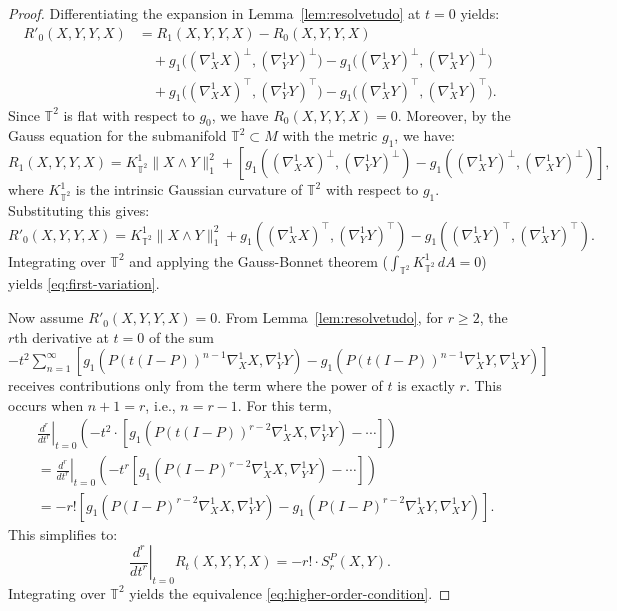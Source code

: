 \documentclass[10pt,a4paper]{amsart}
\begin{document}
\begin{proof}
Differentiating the expansion in Lemma~\ref{lem:resolvetudo} at $t=0$ yields:
\begin{align*}
R'_0(X,Y,Y,X) &= R_1(X,Y,Y,X) - R_0(X,Y,Y,X) \\
&\quad + g_1\bigl((\nabla^1_X X)^\perp, (\nabla^1_Y Y)^\perp\bigr) 
   - g_1\bigl((\nabla^1_X Y)^\perp, (\nabla^1_X Y)^\perp\bigr) \\
&\quad + g_1\bigl((\nabla^1_X X)^\top, (\nabla^1_Y Y)^\top\bigr) 
   - g_1\bigl((\nabla^1_X Y)^\top, (\nabla^1_X Y)^\top\bigr).
\end{align*}
Since $\mathbb{T}^2$ is flat with respect to $g_0$, we have $R_0(X,Y,Y,X)=0$. Moreover, by the Gauss equation for the submanifold $\mathbb{T}^2 \subset M$ with the metric $g_1$, we have:
\[
R_1(X,Y,Y,X) = K^1_{\mathbb{T}^2} \|X\wedge Y\|_1^2 + \left[g_1((\nabla^1_X X)^\perp, (\nabla^1_Y Y)^\perp) - g_1((\nabla^1_X Y)^\perp, (\nabla^1_X Y)^\perp)\right],
\]
where $K^1_{\mathbb{T}^2}$ is the intrinsic Gaussian curvature of $\mathbb{T}^2$ with respect to $g_1$. Substituting this gives:
\[
R'_0(X,Y,Y,X) = K^1_{\mathbb{T}^2} \|X\wedge Y\|_1^2 + g_1((\nabla^1_X X)^\top, (\nabla^1_Y Y)^\top) - g_1((\nabla^1_X Y)^\top, (\nabla^1_X Y)^\top).
\]
Integrating over $\mathbb{T}^2$ and applying the Gauss-Bonnet theorem ($\int_{\mathbb{T}^2} K^1_{\mathbb{T}^2} \, dA = 0$) yields \eqref{eq:first-variation}.

Now assume $R'_0(X,Y,Y,X)=0$. From Lemma~\ref{lem:resolvetudo}, for $r \geq 2$, the $r$th derivative at $t=0$ of the sum $ -t^2\sum_{n=1}^\infty \left[g_1(P(t(I-P))^{n-1}\nabla^1_X X, \nabla^1_Y Y) - g_1(P(t(I-P))^{n-1}\nabla^1_X Y, \nabla^1_X Y)\right] $ receives contributions only from the term where the power of $t$ is exactly $r$. This occurs when $n+1 = r$, i.e., $n = r-1$. For this term,
\begin{align*}
&\left.\frac{d^r}{dt^r}\right|_{t=0} \left( -t^2 \cdot \left[g_1(P(t(I-P))^{r-2}\nabla^1_X X, \nabla^1_Y Y) - \cdots \right] \right) \\
&= \left.\frac{d^r}{dt^r}\right|_{t=0} \left( -t^{r} \left[g_1(P(I-P)^{r-2}\nabla^1_X X, \nabla^1_Y Y) - \cdots \right] \right) \\
&= -r! \left[g_1(P(I-P)^{r-2}\nabla^1_X X, \nabla^1_Y Y) - g_1(P(I-P)^{r-2}\nabla^1_X Y, \nabla^1_X Y)\right].
\end{align*}
This simplifies to:
\[
\left.\frac{d^r}{dt^r}\right|_{t=0} R_t(X,Y,Y,X) = -r! \cdot S_r^P(X,Y).
\]
Integrating over $\mathbb{T}^2$ yields the equivalence \eqref{eq:higher-order-condition}.
\end{proof}
\end{document}
